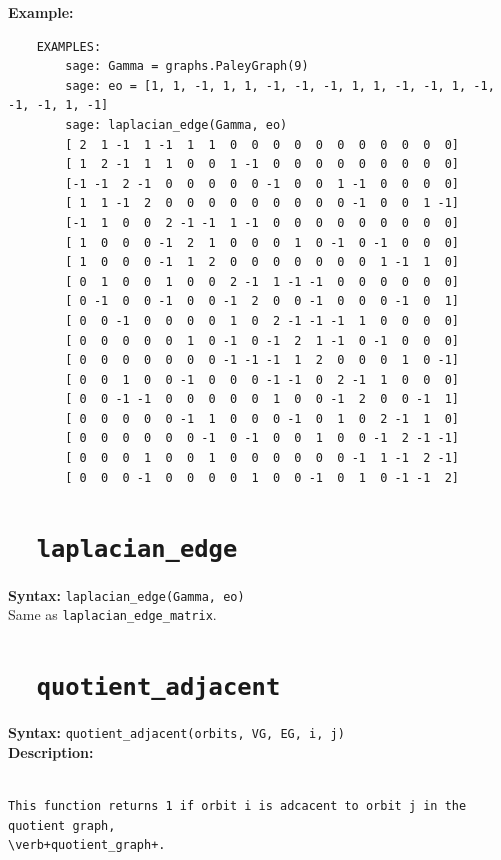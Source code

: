 \documentclass{article}
\begin{document}
\textbf{Example:}
\begin{verbatim}
    EXAMPLES:
        sage: Gamma = graphs.PaleyGraph(9)
        sage: eo = [1, 1, -1, 1, 1, -1, -1, -1, 1, 1, -1, -1, 1, -1, -1, -1, 1, -1]
        sage: laplacian_edge(Gamma, eo)
        [ 2  1 -1  1 -1  1  1  0  0  0  0  0  0  0  0  0  0  0]
        [ 1  2 -1  1  1  0  0  1 -1  0  0  0  0  0  0  0  0  0]
        [-1 -1  2 -1  0  0  0  0  0 -1  0  0  1 -1  0  0  0  0]
        [ 1  1 -1  2  0  0  0  0  0  0  0  0  0 -1  0  0  1 -1]
        [-1  1  0  0  2 -1 -1  1 -1  0  0  0  0  0  0  0  0  0]
        [ 1  0  0  0 -1  2  1  0  0  0  1  0 -1  0 -1  0  0  0]
        [ 1  0  0  0 -1  1  2  0  0  0  0  0  0  0  1 -1  1  0]
        [ 0  1  0  0  1  0  0  2 -1  1 -1 -1  0  0  0  0  0  0]
        [ 0 -1  0  0 -1  0  0 -1  2  0  0 -1  0  0  0 -1  0  1]
        [ 0  0 -1  0  0  0  0  1  0  2 -1 -1 -1  1  0  0  0  0]
        [ 0  0  0  0  0  1  0 -1  0 -1  2  1 -1  0 -1  0  0  0]
        [ 0  0  0  0  0  0  0 -1 -1 -1  1  2  0  0  0  1  0 -1]
        [ 0  0  1  0  0 -1  0  0  0 -1 -1  0  2 -1  1  0  0  0]
        [ 0  0 -1 -1  0  0  0  0  0  1  0  0 -1  2  0  0 -1  1]
        [ 0  0  0  0  0 -1  1  0  0  0 -1  0  1  0  2 -1  1  0]
        [ 0  0  0  0  0  0 -1  0 -1  0  0  1  0  0 -1  2 -1 -1]
        [ 0  0  0  1  0  0  1  0  0  0  0  0  0 -1  1 -1  2 -1]
        [ 0  0  0 -1  0  0  0  0  1  0  0 -1  0  1  0 -1 -1  2]
\end{verbatim}


\section{\tt \ \ laplacian\_edge}

\textbf{Syntax:} \verb}laplacian_edge(Gamma, eo)}\\

Same as \verb+laplacian_edge_matrix+.


\section{\tt \ \ quotient\_adjacent}

\textbf{Syntax:} \verb}quotient_adjacent(orbits, VG, EG, i, j)}\\

\textbf{Description:}
\begin{verbatim}

This function returns 1 if orbit i is adcacent to orbit j in the quotient graph,
\verb+quotient_graph+.

\end{verbatim}
\end{document}

